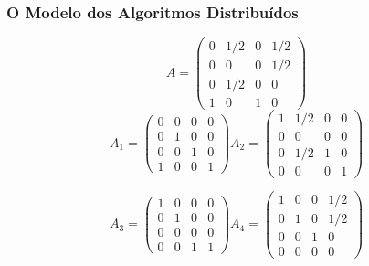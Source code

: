 \documentclass{beamer}
\begin{document}
\begin{frame}
	\frametitle{O Modelo dos Algoritmos Distribuídos}

\begin{equation}\nonumber
A = \begin{pmatrix}
 0 & 1/2 & 0 & 1/2 \\
 0 &  0  & 0 & 1/2 \\
 0 & 1/2 & 0 &  0  \\
 1 &  0  & 1 &  0
\end{pmatrix}
\end{equation}
\vspace{0.4cm}
\begin{equation}\nonumber
A_1 = \begin{pmatrix}
 0 &  0  & 0 &  0 \\
 0 &  1  & 0 &  0 \\
 0 &  0  & 1 &  0  \\
 1 &  0  & 0 &  1
\end{pmatrix}
%
A_2 = \begin{pmatrix}
 1 & 1/2 & 0 &  0 \\
 0 &  0  & 0 &  0 \\
 0 & 1/2 & 1 &  0  \\
 0 &  0  & 0 &  1
\end{pmatrix}
\end{equation}

\begin{equation}\nonumber
A_3 = \begin{pmatrix}
 1 &  0  & 0 &  0 \\
 0 &  1  & 0 &  0 \\
 0 &  0  & 0 &  0  \\
 0 &  0  & 1 &  1
\end{pmatrix}
%
A_4 = \begin{pmatrix}
 1 &  0  & 0 & 1/2 \\
 0 &  1  & 0 & 1/2 \\
 0 &  0  & 1 &  0  \\
 0 &  0  & 0 &  0
\end{pmatrix}
\end{equation}	
	
\end{frame}
\end{document}

